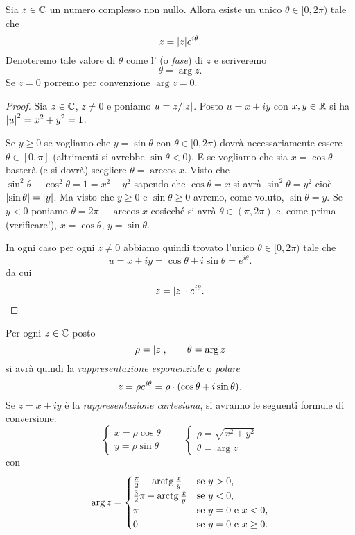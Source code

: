 \begin{theorem}[argomento]
%
Sia $z\in {\mathbb C}$ un numero complesso non nullo. Allora esiste un
unico $\theta\in [0,2\pi)$ tale che
\[
z = {\left|z\right|} e^{i\theta}.
\]
Denoteremo tale valore di $\theta$ come l' 
(o \emph{fase}) di $z$
e scriveremo
\[
  \theta = \arg z.
\]
Se $z=0$ porremo per convenzione $\arg z=0$.
\end{theorem}
%
\begin{proof}
Sia $z\in {\mathbb C}$, $z\neq 0$ e poniamo $u = z/{\left|z\right|}$.
Posto $u=x+iy$ con $x,y\in {\mathbb R}$ si ha ${\left|u\right|}^2 = x^2+y^2=1$.

Se $y\ge 0$ se vogliamo che $y=\sin \theta$ con $\theta\in [0,2\pi)$
dovrà necessariamente essere $\theta \in [0,\pi]$
(altrimenti si avrebbe $\sin \theta<0$).
E se vogliamo che sia $x=\cos \theta$ basterà (e si dovrà) scegliere
$\theta = \arccos x$.
Visto che $\sin^2 \theta + \cos^2\theta = 1 = x^2 + y^2$
sapendo che $\cos \theta = x$
si avrà
$\sin^2 \theta = y^2$ cioè ${\left|\sin \theta\right|}={\left|y\right|}$.
Ma visto che $y\ge 0$ e $\sin \theta\ge 0$
avremo, come voluto, $\sin \theta = y$.
Se $y<0$ poniamo $\theta = 2\pi - \arccos x$
cosicché si avrà $\theta \in (\pi, 2\pi)$
e, come prima (verificare!),
$x=\cos \theta$, $y=\sin \theta$.

In ogni caso per ogni $z\neq 0$ abbiamo quindi trovato l'unico
$\theta\in [0,2\pi)$ tale che
\[
  u
  = x + i y
  = \cos \theta + i\sin \theta
  = e^{i\theta}.
\]
da cui
\[
  z = {\left|z\right|}\cdot e^{i\theta}.
\]
\end{proof}

Per ogni $z\in {\mathbb C}$ posto
\[
  \rho = {\left|z\right|}, \qquad \theta = \arg z
\]
si avrà quindi la \emph{rappresentazione esponenziale} o \emph{polare}
\[
  z = \rho e^{i\theta} = \rho \cdot {\left( \cos \theta
  + i \sin \theta \right)}.
\]
Se $z=x+iy$ è la \emph{rappresentazione cartesiana}, si avranno
le seguenti formule di conversione:
\[
\begin{cases}
  x = \rho \cos \theta\\
  y = \rho \sin \theta
\end{cases}
\qquad
\begin{cases}
 \rho = \sqrt{x^2+y^2}\\
 \theta = \arg z
\end{cases}
\]
con
\[
  \arg z =
  \begin{cases}
   \frac \pi 2 - \operatorname{arctg} \frac x y & \text{se $y>0$,} \\
   \frac 3 2 \pi- \operatorname{arctg} \frac x y & \text{se $y<0$,} \\
   \pi & \text{se $y=0$ e $x<0$,} \\
   0 & \text{se $y=0$ e $x\ge 0$.}
   \end{cases}
\]

